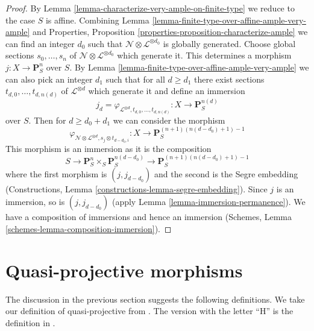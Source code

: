 \begin{proof}
By Lemma \ref{lemma-characterize-very-ample-on-finite-type}
we reduce to the case $S$ is affine. Combining
Lemma \ref{lemma-finite-type-over-affine-ample-very-ample} and
Properties, Proposition \ref{properties-proposition-characterize-ample}
we can find an integer $d_0$ such that
$\mathcal{N} \otimes \mathcal{L}^{\otimes d_0}$
is globally generated. Choose global sections
$s_0, \ldots, s_n$ of $\mathcal{N} \otimes \mathcal{L}^{\otimes d_0}$
which generate it. This determines a morphism
$j : X \to \mathbf{P}^n_S$ over $S$. By
Lemma \ref{lemma-finite-type-over-affine-ample-very-ample}
we can also pick an integer $d_1$ such that for all $d \geq d_1$
there exist sections $t_{d, 0}, \ldots, t_{d, n(d)}$
of $\mathcal{L}^{\otimes d}$ which generate it and define
an immersion
$$
j_d = \varphi_{\mathcal{L}^{\otimes d}, t_{d, 0}, \ldots, t_{d, n(d)}} :
X
\longrightarrow
\mathbf{P}^{n(d)}_S
$$
over $S$. Then for $d \geq d_0 + d_1$ we can consider the
morphism
$$
\varphi_{\mathcal{N} \otimes \mathcal{L}^{\otimes d},
s_j \otimes t_{d - d_0, i}} :
X
\longrightarrow
\mathbf{P}^{(n + 1)(n(d - d_0) + 1) - 1}_S
$$
This morphism is an immersion as it is the composition
$$
S \to \mathbf{P}^n_S \times_S \mathbf{P}^{n(d - d_0)}_S
\to \mathbf{P}^{(n + 1)(n(d - d_0) + 1) - 1}_S
$$
where the first morphism is $(j, j_{d - d_0})$ and
the second is the Segre embedding
(Constructions, Lemma \ref{constructions-lemma-segre-embedding}).
Since $j$ is an immersion, so is $(j, j_{d - d_0})$
(apply Lemma \ref{lemma-immersion-permanence}). We have a composition of
immersions and hence an immersion
(Schemes, Lemma \ref{schemes-lemma-composition-immersion}).
\end{proof}










\section{Quasi-projective morphisms}
\label{section-quasi-projective}

\noindent
The discussion in the previous section suggests the following definitions.
We take our definition of quasi-projective from \cite{EGA}. The version
with the letter ``H'' is the definition in \cite{H}.

